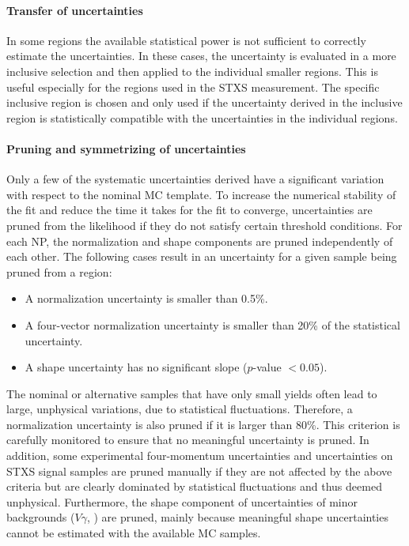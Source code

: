 \paragraph{Transfer of uncertainties}
In some regions the available statistical power is not sufficient to correctly estimate the uncertainties. 
In these cases, the uncertainty is evaluated in a more inclusive selection and then applied to the individual smaller regions. This is useful especially for the regions used in the STXS measurement. The specific inclusive region is chosen and only used if the uncertainty derived in the inclusive region is statistically compatible with the uncertainties in the individual regions. 

\paragraph{Pruning and symmetrizing of uncertainties}
Only a few of the systematic uncertainties derived have a significant variation with respect to the nominal MC template. To increase the numerical stability of the fit and reduce the time it takes for the fit to converge, uncertainties are pruned from the likelihood if they do not satisfy certain threshold conditions.
For each NP, the normalization and shape components are pruned independently of each other.
The following cases result in an uncertainty for a given sample being pruned from a region:
\begin{itemize}
    \item A normalization uncertainty is smaller than 0.5\%.
    \item A four-vector normalization uncertainty is smaller than 20\% of the statistical uncertainty. 
    \item A shape uncertainty has no significant slope ($p$-value $< 0.05$).
\end{itemize}
The nominal or alternative samples that have only small yields often lead to large, unphysical variations, due to statistical fluctuations. 
Therefore, a normalization uncertainty is also pruned if it is larger than 80\%. 
This criterion is carefully monitored to ensure that no meaningful uncertainty is pruned.
In addition, some experimental four-momentum uncertainties and uncertainties on STXS signal samples are pruned manually if they are not affected by the above criteria but are clearly dominated by statistical fluctuations and thus deemed unphysical.
Furthermore, the shape component of uncertainties of minor backgrounds ($V\gamma$, \Zgamma) are pruned, mainly because meaningful shape uncertainties cannot be estimated with the available MC samples. 

